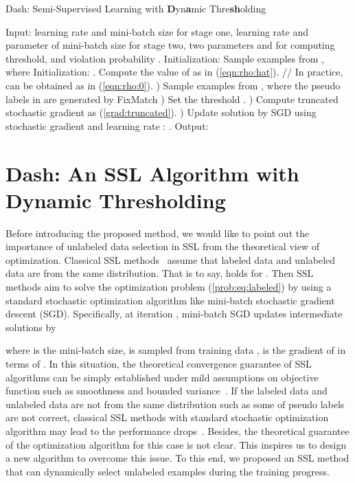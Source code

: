 \documentclass{article}
\begin{document}
\begin{algorithm*}[t]
\caption{Dash: Semi-Supervised Learning with {\bf D}yn{\bf a}mic Thre{\bf sh}olding}\label{alg:dash}
\begin{algorithmic}
\STATE Input: learning rate  and mini-batch size  for stage one, learning rate  and parameter  of mini-batch size for stage two, two parameters  and  for computing threshold, and violation probability .
\STATE Initialization: 
\FOR{}
    \STATE Sample  examples   from ,
    \STATE  where 
\ENDFOR
{}
\STATE Initialization:  .
\STATE Compute the value of  as in (\ref{eqn:rho:hat}). {\color{gray}// In practice,  can be obtained as in (\ref{eqn:rho:0}).} 
\FOR{}
	) Sample  examples from , where the pseudo labels in  are generated by FixMatch 
    ) Set the threshold .
    ) Compute truncated stochastic gradient  as (\ref{grad:truncated}). 
    ) Update solution by SGD using stochastic gradient  and learning rate : .
\ENDFOR
\STATE Output: 
\end{algorithmic}
\end{algorithm*}

\section{Dash: An SSL Algorithm with Dynamic Thresholding}
Before introducing the proposed method, we would like to point out the importance of unlabeled data selection in SSL from the theoretical view of optimization. Classical SSL methods~\citep{zhu2005semi,chapelle2006semi,zhu2009introduction,hady2013semi,van2020survey} assume that labeled data and unlabeled data are from the same distribution. That is to say,  holds for . Then SSL methods aim to solve the optimization problem (\ref{prob:eq:labeled}) by using a standard stochastic optimization algorithm like mini-batch stochastic gradient descent (SGD). Specifically, at iteration , mini-batch SGD updates intermediate solutions by

where  is the mini-batch size,  is sampled from training data ,  is the gradient of  in terms of . In this situation, the theoretical convergence guarantee of SSL algorithms can be simply established under mild assumptions on objective function  such as smoothness and bounded variance~\citep{ghadimi2016mini}. If the labeled data and unlabeled data are not from the same distribution such as some of pseudo labels are not correct, classical SSL methods with standard stochastic optimization algorithm may lead to the performance drops~\citep{chapelle2006semi,oliver2018realistic}. Besides, the theoretical guarantee of the optimization algorithm for this case is not clear. This inspires us to design a new algorithm to overcome this issue. To this end, we proposed an SSL method that can dynamically select unlabeled examples during the training progress. 
\end{document}

